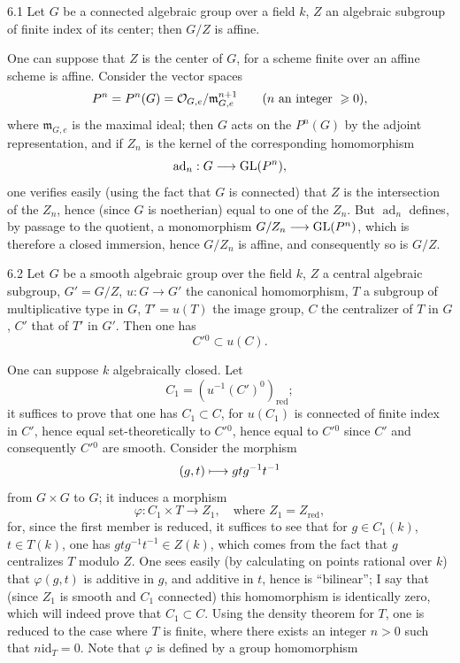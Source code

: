 \begin{lemma}{6.1}\label{XII.6.1}
Let $G$ be a connected algebraic group over a field $k$, $Z$ an algebraic subgroup of finite index of its center; then $G/Z$ is affine.
\end{lemma}
One can suppose that $Z$ is the center of $G$, for a scheme finite over an affine scheme is affine. Consider the vector spaces
\[
P^n=P^n(G)=\mathcal{O}_{G,e}/\mathfrak m_{G,e}^{n+1}\qquad(n\text{ an integer }\geqslant0),
\]
where $\mathfrak m_{G,e}$ is the maximal ideal; then $G$ acts on the $P^n(G)$ by the adjoint representation, and if $Z_n$ is the kernel of the corresponding homomorphism
\[
\operatorname{ad}_n:G\longrightarrow\operatorname{GL}(P^n),
\]
one verifies easily (using the fact that $G$ is connected) that $Z$ is the intersection of the $Z_n$, hence (since $G$ is noetherian) equal to one of the $Z_n$. But $\operatorname{ad}_n$ defines, by passage to the quotient, a monomorphism $G/Z_n\longrightarrow\operatorname{GL}(P^n)$, which is therefore a closed immersion, hence $G/Z_n$ is affine, and consequently so is $G/Z$.
\begin{lemma}{6.2}\label{XII.6.2}
Let $G$ be a smooth algebraic group over the field $k$, $Z$ a central algebraic subgroup, $G'=G/Z$, $u:G\to G'$ the canonical homomorphism, $T$ a subgroup of multiplicative type in $G$, $T'=u(T)$ the image group, $C$ the centralizer of $T$ in $G$, $C'$ that of $T'$ in $G'$. Then one has
\[
C'{}^0\subset u(C).
\]
\end{lemma}
One can suppose $k$ algebraically closed. Let
\[
C_1=(u^{-1}(C')^0)_{\mathrm{red}};
\]
it suffices to prove that one has $C_1\subset C$, for $u(C_1)$ is connected of finite index in $C'$, hence equal set-theoretically to $C'{}^0$, hence equal to $C'{}^0$ since $C'$ and consequently $C'{}^0$ are smooth. Consider the morphism
\[
(g,t)\longmapsto gtg^{-1}t^{-1}
\]
from $G\times G$ to $G$; it induces a morphism
\[
\varphi:C_1\times T\to Z_1,\quad\text{where }Z_1=Z_{\mathrm{red}},
\]
for, since the first member is reduced, it suffices to see that for $g\in C_1(k)$, $t\in T(k)$, one has $gtg^{-1}t^{-1}\in Z(k)$, which comes from the fact that $g$ centralizes $T$ modulo $Z$. One sees easily (by calculating on points rational over $k$) that $\varphi(g,t)$ is additive in $g$, and additive in $t$, hence is ``bilinear''; I say that (since $Z_1$ is smooth and $C_1$ connected) this homomorphism is identically zero, which will indeed prove that $C_1\subset C$. Using the density theorem for $T$, one is reduced to the case where $T$ is finite, \ie where there exists an integer $n>0$ such that $n\mathrm{id}_T=0$. Note that $\varphi$ is defined by a group homomorphism
